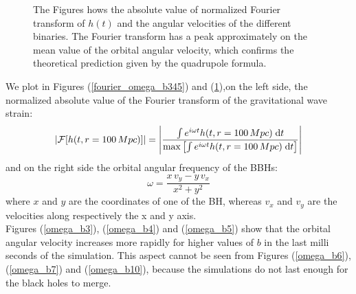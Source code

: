 \begin{figure}[]
   \quad

  \quad
{}
   
   
\caption{The Figures hows the absolute  value of normalized Fourier transform of $h(t)$ and the angular velocities of the different binaries. The Fourier transform has a peak approximately on the mean value of the orbital angular velocity, which confirms the theoretical prediction given by the quadrupole formula.}
\label{fourier_omega_b6710}

\end{figure}
We plot in Figures (\ref{fourier_omega_b345}) and (\ref{fourier_omega_b6710}),on the left side, the normalized absolute value of the Fourier transform of the gravitational wave strain:
\[
\abs{\mathcal{F}[h(t,r=100 \, Mpc)]} = \abs{
\dfrac{\int e^{i \omega t}  h(t,r=100 \, Mpc) \;\dd t }{\max \qty[\int e^{i \omega t}  h(t,r=100 \, Mpc) \;\dd t] }
}
\]
and on the right side the orbital angular frequency of the BBHs:
\[
\omega = \dfrac{x \, v_y - y \,v_x}{x^{2}+y^{2}}
\]
where $x$ and $y$ are the coordinates of one of the BH, whereas $v_x$ and $v_y$ are the velocities along respectively the x and y axis.\\
Figures (\ref{omega_b3}), (\ref{omega_b4}) and (\ref{omega_b5}) show that the orbital angular velocity increases more rapidly for higher values of $b$ in the last milli seconds of the simulation. 
This aspect cannot be seen from Figures (\ref{omega_b6}), (\ref{omega_b7}) and (\ref{omega_b10}), because the simulations do not last enough for the black holes to merge. 
